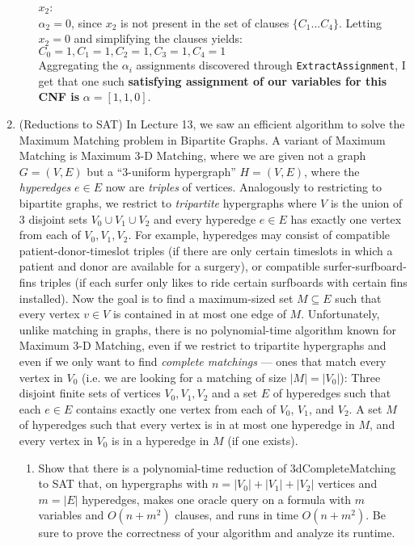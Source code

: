 \documentclass[11pt]{article}
\begin{document}
\begin{enumerate}
\begin{enumerate}
      $x_2$: \\
      $\alpha_2 = 0$, since $x_2$ is not present in the set of clauses $\{ C_1 ... C_4 \}$. Letting $x_2 = 0$ and simplifying the clauses yields: \\
      $C_0 = 1, C_1 = 1, C_2 = 1, C_3 = 1, C_4 = 1$ \\

      Aggregating the $\alpha_i$ assignments discovered through \texttt{ExtractAssignment}, I get that one such \textbf{satisfying assignment of our variables for this CNF is} $\alpha = [1,1,0]$. \\

  \end{enumerate}

\item (Reductions to SAT) In Lecture 13, we saw an efficient algorithm to solve the Maximum Matching problem in Bipartite Graphs. A variant of Maximum Matching is Maximum 3-D Matching, where we are given not a graph $G=(V,E)$ but a ``3-uniform hypergraph'' $H=(V,E)$, where the {\em hyperedges} $e\in E$ now are {\em triples} of vertices.  
Analogously to restricting to bipartite graphs, we restrict to {\em tripartite} hypergraphs where $V$ is the union of 3 disjoint sets $V_0\cup V_1 \cup V_2$ and every hyperedge $e\in E$ has exactly one vertex from each of $V_0,V_1,V_2$. For example, hyperedges may consist of 
compatible patient-donor-timeslot triples (if there are only certain timeslots in which a patient and donor are available for a surgery), 
or compatible surfer-surfboard-fins triples (if each surfer only likes to ride certain surfboards with certain fins installed).
Now the goal is to find a maximum-sized set $M\subseteq E$ such that every vertex $v\in V$ is contained in at most one edge of $M$.  
Unfortunately, unlike matching in graphs, there is no polynomial-time algorithm known for Maximum 3-D Matching, even if we restrict to tripartite hypergraphs and even if we only want to find {\em complete matchings} --- ones that match every vertex in $V_0$ (i.e. we are looking for a matching of size $|M|=|V_0|$):
{Three disjoint finite sets of vertices $V_0,V_1,V_2$ and a set $E$ of hyperedges  such that each $e\in E$ contains exactly one vertex from each of $V_0$, $V_1$, and $V_2$.}
{A set $M$ of hyperedges such that every vertex is in at most one hyperedge in $M$, and every vertex in $V_0$ is in a hyperedge in $M$ (if one exists).
}
\begin{enumerate}
\item Show that there is a polynomial-time reduction of 3dCompleteMatching to SAT that, on hypergraphs with $n=|V_0|+|V_1|+|V_2|$ vertices and $m=|E|$ hyperedges, makes one oracle query on a formula with $m$ variables and $O(n + m^2)$ clauses, and runs in time $O(n + m^2)$.  Be sure to prove the correctness of your algorithm and analyze its runtime. 


\end{enumerate}
\end{enumerate}
\end{document}
